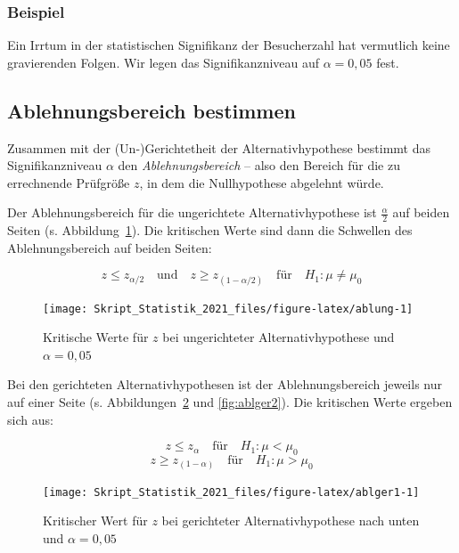 \documentclass[
  11pt,
  ngerman,
  a4paper,
]{report}
\begin{document}
\hypertarget{beispiel-2}{%
\subsubsection{Beispiel}\label{beispiel-2}}

Ein Irrtum in der statistischen Signifikanz der Besucherzahl hat vermutlich keine gravierenden Folgen. Wir legen das Signifikanzniveau auf \(\alpha=0{,}05\) fest.

\hypertarget{ablehnungsbereich-bestimmen}{%
\subsection{Ablehnungsbereich bestimmen}\label{ablehnungsbereich-bestimmen}}

Zusammen mit der (Un-)Gerichtetheit der Alternativhypothese bestimmt das Signifikanzniveau \(\alpha\) den \emph{Ablehnungsbereich} -- also den Bereich für die zu errechnende Prüfgröße \(z\), in dem die Nullhypothese abgelehnt würde.

Der Ablehnungsbereich für die ungerichtete Alternativhypothese ist \(\frac{\alpha}{2}\) auf beiden Seiten (s. Abbildung~\ref{fig:ablung}). Die kritischen Werte sind dann die Schwellen des Ablehnungsbereich auf beiden Seiten:

\[
z \leq z_{\alpha/2} \quad \textrm{und} \quad z \geq z_{(1-\alpha/2)} \quad \textrm{für} \quad H_1: \mu \neq \mu_0
\label{eq:kritneq}
\]

\begin{figure}[!h]

{\centering \texttt{[image: Skript\_Statistik\_2021\_files/figure-latex/ablung-1]} 

}

\caption{Kritische Werte für $z$ bei ungerichteter Alternativhypothese und $\alpha=0{,}05$}\label{fig:ablung}
\end{figure}

Bei den gerichteten Alternativhypothesen ist der Ablehnungsbereich jeweils nur auf einer Seite (s. Abbildungen~\ref{fig:ablger1} und \ref{fig:ablger2}). Die kritischen Werte ergeben sich aus:

\[
z \leq z_{\alpha} \quad \textrm{für} \quad H_1: \mu < \mu_0
\label{eq:kritless}
\]
\[
z \geq z_{(1-\alpha)} \quad \textrm{für} \quad H_1: \mu > \mu_0
\label{eq:kritless}
\]

\begin{figure}[!h]

{\centering \texttt{[image: Skript\_Statistik\_2021\_files/figure-latex/ablger1-1]} 

}

\caption{Kritischer Wert für $z$ bei gerichteter Alternativhypothese nach unten und $\alpha=0{,}05$}\label{fig:ablger1}
\end{figure}
\end{document}
